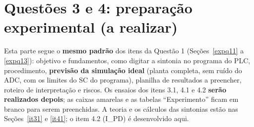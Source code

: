 \section{Questões 3 e 4: preparação experimental (a realizar)}\label{q34}
Esta parte segue o \textbf{mesmo padrão} dos itens da Questão 1 (Seções~\ref{expq11} a \ref{expq13}): objetivo e fundamentos, como digitar a sintonia no programa do PLC, procedimento, \textbf{previsão da simulação ideal} (planta completa, sem ruído do ADC, com os limites do SC do programa), planilha de resultados a preencher, roteiro de interpretação e riscos. Os ensaios dos itens 3.1, 4.1 e 4.2 \textbf{serão realizados depois}; as caixas amarelas e as tabelas ``Experimento'' ficam em branco para serem preenchidas. A teoria e os cálculos das sintonias estão nas Seções~\ref{it31} e \ref{it41}; o item 4.2 (I\_PD) é desenvolvido aqui.

